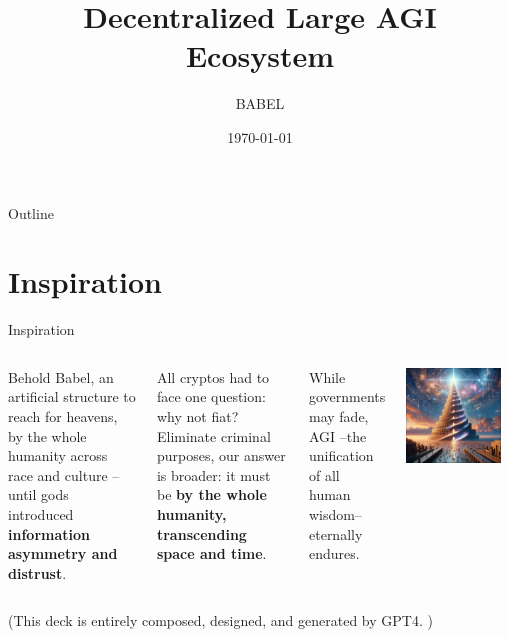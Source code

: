 \documentclass{beamer}
\title{Decentralized Large AGI Ecosystem}
\author{BABEL}
\institute{P.I.V.O.T. DAO}
\date{\today}
\begin{document}
\begin{frame}
\titlepage
\end{frame}

\begin{frame}{Outline}
\tableofcontents
\end{frame}

\section{Inspiration}
\begin{frame}{Inspiration}

\begin{columns}
Behold Babel, an artificial structure to reach for heavens, by the whole humanity across race and culture -- until gods introduced \textbf{information asymmetry and distrust}. 

All cryptos had to face one question: why not fiat? Eliminate criminal purposes, our answer is broader: it must be \textbf{by the whole humanity, transcending space and time}. 

While governments may fade, AGI --the unification of all human wisdom-- eternally endures.
\begin{center}
\includegraphics[width=0.9\textwidth]{images/babel.png}
\end{center}
\end{columns}


\begin{center}
(This deck is entirely composed, designed, and generated by GPT4. )
\end{center}
\end{frame}
\end{document}
